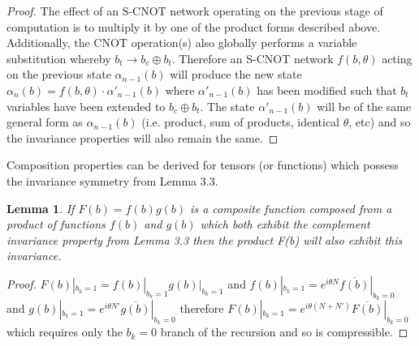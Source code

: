 \documentclass[reqno]{amsart}
\newtheorem{lem}[thm]{Lemma}
\theoremstyle{definition}
\theoremstyle{remark}
\begin{document}
\begin{proof}
\noindent
The effect of an S-CNOT network operating on the previous stage of computation is to multiply it by one of the product forms described above. Additionally, the CNOT operation(s) also globally performs a variable substitution whereby $b_t \rightarrow b_c \oplus b_t$. Therefore an S-CNOT network $f(b,\theta)$ acting on the previous state $\alpha_{n-1}(b)$ will produce the new state 
$\alpha_n(b) = f(b,\theta) \cdot \alpha'_{n-1}(b)$ where $\alpha'_{n-1}(b)$ has been modified such that $b_t$ variables have been extended to $b_c \oplus b_t$. The state $\alpha'_{n-1}(b)$ will be of the same general form as $\alpha_{n-1}(b)$ (i.e. product, sum of products, identical $\theta$, etc) and so the invariance properties will also remain the same.
 
 \end{proof}
 
 
 \noindent
Composition properties can be derived for tensors (or functions)  which possess the  invariance symmetry from Lemma 3.3.
 
 
 \begin{lem}
 If $F(b) = f(b) g(b)$ is a composite  function composed from a product of functions $f(b)$ and $g(b)$ which both exhibit the complement invariance property from Lemma 3.3 then the product F(b)  will also exhibit this invariance.
 \end{lem}


\begin{proof}
$F(b)|_{b_k = 1} = f(b) |_{b_k = 1} g(b) |_{b_k = 1}  $ and $f(b) |_{b_k = 1} = e^{i \theta N} \overline{f(b)} |_{b_k=0} $ and $g(b) |_{b_k = 1} = e^{i \theta N'} \overline{g(b)} |_{b_k=0} $ therefore $F(b) |_{b_k = 1} = e^{i \theta(N+N')} \overline{F(b)} |_{b_k = 0}$ which requires only the $b_k = 0$ branch of the recursion and so is compressible.
\end{proof}
\end{document}
